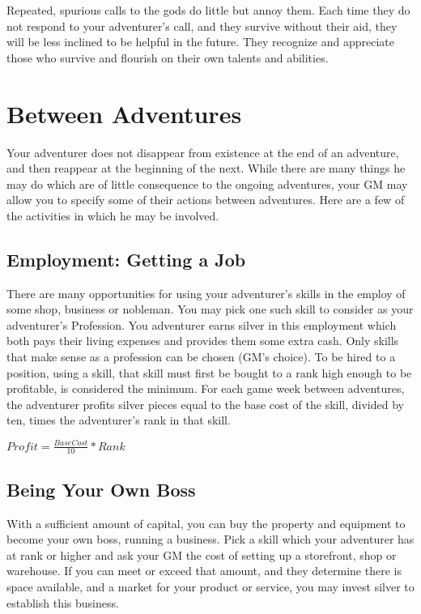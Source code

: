 \begin{multicols*}{2}
Repeated, spurious calls to the gods do little but annoy them. Each time they do not respond to your adventurer's call, and they survive without their aid, they will be less inclined to be helpful in the future. They recognize and appreciate those who survive and flourish on their own talents and abilities.
\section{Between Adventures}
Your adventurer does not disappear from existence at the end of an adventure, and then reappear at the beginning of the next. While there are many things he may do which are of little consequence to the ongoing adventures, your GM may allow you to specify some of their actions between adventures. Here are a few of the activities in which he may be involved.
\subsection{Employment: Getting a Job}
There are many opportunities for using your adventurer's skills in the employ of some shop, business or nobleman. You may pick one such skill to consider as your adventurer's Profession. You adventurer earns silver in this employment which both pays their living expenses and provides them some extra cash. Only skills that make sense as a profession can be chosen (GM's choice). To be hired to a position, using a skill, that skill must first be bought to a rank high enough to be profitable,  is considered the minimum. For each game week between adventures, the adventurer profits silver pieces equal to the base cost of the skill, divided by ten, times the adventurer's rank in that skill.
\begin{normbox}
\large
$Profit = \frac{Base Cost}{10} * Rank$
\end{normbox}
\subsection{Being Your Own Boss}
With a sufficient amount of capital, you can buy the property and equipment to become your own boss, running a business. Pick a skill which your adventurer has at rank  or higher and ask your GM the cost of setting up a storefront, shop or warehouse. If you can meet or exceed that amount, and they determine there is space available, and a market for your product or service, you may invest silver to establish this business.


\end{multicols*}
